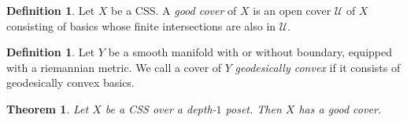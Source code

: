 \documentclass[]{amsart}
\newcommand{\mcal}[1]{\mathcal{#1}}
\numberwithin{equation}{section}
\theoremstyle{definition}
\newtheorem{definition}[equation]{Definition}%
\theoremstyle{remark}
\theoremstyle{plain}
\newtheorem{theorem}[equation]{Theorem}
\begin{document}
\begin{definition}
    Let $X$ be a CSS. A \emph{good cover} of $X$ is an open cover $\mcal{U}$ of $X$ consisting of basics whose finite intersections are also in $\mcal{U}$.
\end{definition}

\begin{definition}
    Let $Y$ be a smooth manifold with or without boundary, equipped with a riemannian metric. We call a cover of $Y$ \emph{geodesically convex} if it consists of geodesically convex basics.
\end{definition}


\begin{theorem}
    Let $X$ be a CSS {\color{MidnightBlue} over a depth-$1$ poset}. Then $X$ has a good cover.
\end{theorem}
\end{document}
